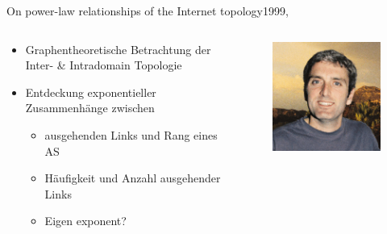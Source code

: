 \documentclass[ngerman,compress,hyperref={bookmarks}]{beamer}
\begin{document}
\begin{frame}{On power-law relationships of the Internet topology}{1999, \cite{Faloutsos:1999:PRI:316194.316229}}
  \begin{columns}[c]
    \begin{column}{0.5\textwidth}
      \begin{itemize}
        \item Graphentheoretische Betrachtung der Inter- \& Intradomain Topologie
        \item Entdeckung exponentieller Zusammenhänge zwischen
        \begin{itemize}
          \item ausgehenden Links und Rang eines AS
          \item Häufigkeit und Anzahl ausgehender Links
          \item Eigen exponent?
        \end{itemize}
      \end{itemize}
    \end{column}
    \begin{column}{0.1\textwidth}
      \begin{figure}
        \includegraphics[width=1\textwidth]{images/faloutsos_m}\\

\end{figure}
\end{column}
\end{columns}
\end{frame}
\end{document}
